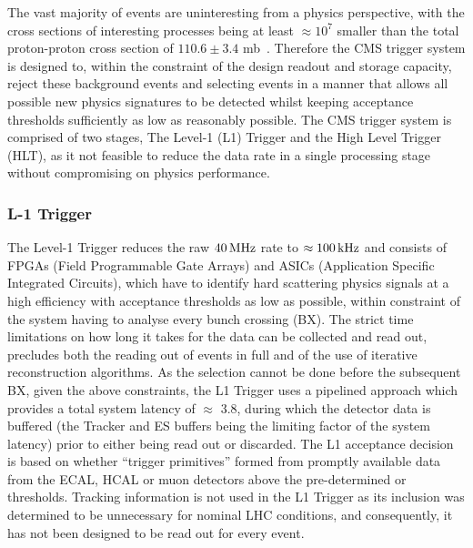 The vast majority of events are uninteresting from a physics perspective, with the cross sections of interesting processes being at least $\approx 10^{7}$ smaller than the total proton-proton cross section of $110.6 \pm 3.4$ mb~\cite{Antchev:2017dia}.
Therefore the CMS trigger system is designed to, within the constraint of the design readout and storage capacity, reject these background events and selecting events in a manner that allows all possible new physics signatures to be detected whilst keeping acceptance thresholds sufficiently as low as reasonably possible.
The CMS trigger system is comprised of two stages, The Level-1 (L1) Trigger and the High Level Trigger (HLT), as it not feasible to reduce the data rate in a single processing stage without compromising on physics performance.

\subsubsection{L-1 Trigger}\label{paragraph:L1}
The Level-1 Trigger reduces the raw $40\text{\,MHz}$ rate to $\approx100\text{\,kHz}$ and consists of FPGAs (Field Programmable Gate Arrays) and ASICs (Application Specific Integrated Circuits), which have to identify hard scattering physics signals at a high efficiency with acceptance thresholds as low as possible, within constraint of the system having to analyse every bunch crossing (BX).
The strict time limitations on how long it takes for the data can be collected and read out, precludes both the reading out of events in full and of the use of iterative reconstruction algorithms.
As the selection cannot be done before the subsequent BX, given the above constraints, the L1 Trigger uses a pipelined approach which provides a total system latency of $\approx$ 3.8\mus, during which the detector data is buffered (the Tracker and ES buffers being the limiting factor of the system latency) prior to either being read out or discarded.
The L1 acceptance decision is based on whether ``trigger primitives'' formed from promptly available data from the ECAL, HCAL or muon detectors above the pre-determined \pT or \ET thresholds.
Tracking information is not used in the L1 Trigger as its inclusion was determined to be unnecessary for nominal LHC conditions, and consequently, it has not been designed to be read out for every event.


